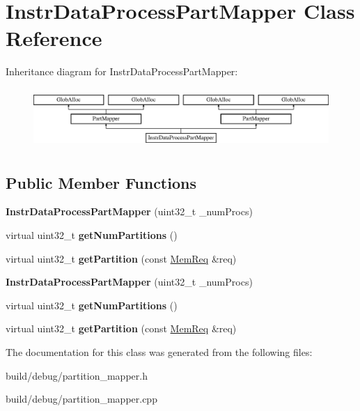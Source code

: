 \hypertarget{classInstrDataProcessPartMapper}{\section{Instr\-Data\-Process\-Part\-Mapper Class Reference}
\label{classInstrDataProcessPartMapper}
}
Inheritance diagram for Instr\-Data\-Process\-Part\-Mapper\-:\begin{figure}[H]
\begin{center}
\leavevmode
\includegraphics[height=2.295082cm]{classInstrDataProcessPartMapper}
\end{center}
\end{figure}
\subsection*{Public Member Functions}
\begin{DoxyCompactItemize}
\item 
\hypertarget{classInstrDataProcessPartMapper_a9ec951513521573dfa456c182c87d2bd}{{\bfseries Instr\-Data\-Process\-Part\-Mapper} (uint32\-\_\-t \-\_\-num\-Procs)}\label{classInstrDataProcessPartMapper_a9ec951513521573dfa456c182c87d2bd}

\item 
\hypertarget{classInstrDataProcessPartMapper_ad33080da0f9a80997cf670d911db1d3f}{virtual uint32\-\_\-t {\bfseries get\-Num\-Partitions} ()}\label{classInstrDataProcessPartMapper_ad33080da0f9a80997cf670d911db1d3f}

\item 
\hypertarget{classInstrDataProcessPartMapper_a310854ad8ab4e249216ccb7b0dc6c917}{virtual uint32\-\_\-t {\bfseries get\-Partition} (const \hyperlink{structMemReq}{Mem\-Req} \&req)}\label{classInstrDataProcessPartMapper_a310854ad8ab4e249216ccb7b0dc6c917}

\item 
\hypertarget{classInstrDataProcessPartMapper_a9ec951513521573dfa456c182c87d2bd}{{\bfseries Instr\-Data\-Process\-Part\-Mapper} (uint32\-\_\-t \-\_\-num\-Procs)}\label{classInstrDataProcessPartMapper_a9ec951513521573dfa456c182c87d2bd}

\item 
\hypertarget{classInstrDataProcessPartMapper_ad33080da0f9a80997cf670d911db1d3f}{virtual uint32\-\_\-t {\bfseries get\-Num\-Partitions} ()}\label{classInstrDataProcessPartMapper_ad33080da0f9a80997cf670d911db1d3f}

\item 
\hypertarget{classInstrDataProcessPartMapper_ad71a9d7eafece757bb45a14a1481260a}{virtual uint32\-\_\-t {\bfseries get\-Partition} (const \hyperlink{structMemReq}{Mem\-Req} \&req)}\label{classInstrDataProcessPartMapper_ad71a9d7eafece757bb45a14a1481260a}

\end{DoxyCompactItemize}


The documentation for this class was generated from the following files\-:\begin{DoxyCompactItemize}
\item 
build/debug/partition\-\_\-mapper.\-h\item 
build/debug/partition\-\_\-mapper.\-cpp\end{DoxyCompactItemize}
